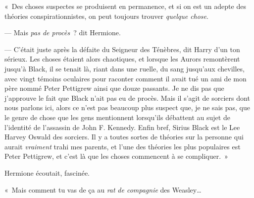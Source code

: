 «~Des choses suspectes se produisent en permanence, et si on est un adepte des théories conspirationnistes, on peut toujours trouver \emph{quelque chose}.

--- Mais \emph{pas de procès}~? dit Hermione.

--- C'était juste après la défaite du Seigneur des Ténèbres, dit Harry d'un ton sérieux. Les choses étaient alors chaotiques, et lorsque les Aurors remontèrent jusqu'à Black, il se tenait là, riant dans une ruelle, du sang jusqu'aux chevilles, avec vingt témoins oculaires pour raconter comment il avait tué un ami de mon père nommé Peter Pettigrew ainsi que douze passants. Je ne dis pas que j'approuve le fait que Black n'ait pas eu de procès. Mais il s'agit de sorciers dont nous parlons ici, alors ce n'est pas beaucoup plus suspect que, je ne sais pas, que le genre de chose que les gens mentionnent lorsqu'ils débattent au sujet de l'identité de l'assassin de John F. Kennedy. Enfin bref, Sirius Black est le Lee Harvey Oswald des sorciers. Il y a toutes sortes de théories sur la personne qui aurait \emph{vraiment} trahi mes parents, et l'une des théories les plus populaires est Peter Pettigrew, et c'est là que les choses commencent à se compliquer.~»

Hermione écoutait, fascinée.

«~Mais comment tu vas de ça au \emph{rat} \emph{de compagnie} des Weasley…

